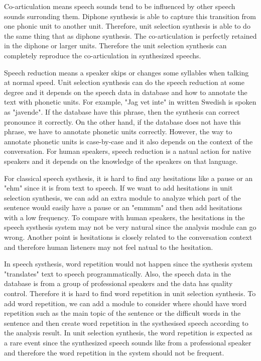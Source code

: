 \documentclass[12pt]{article}
\newenvironment{problem}[2][Problem]{\begin{trivlist}
\item[\hskip \labelsep {\bfseries #1}\hskip \labelsep {\bfseries #2.}]}{\end{trivlist}}
\begin{document}
\begin{problem}{2.2}

    Co-articulation means speech sounds tend to be influenced by other speech
    sounds surronding them.
    Diphone synthesis is able to capture this transition from one phonic unit
    to another unit.
    Therefore, unit selection synthesis is able to do the same thing that as
    diphone synthesis.
    The co-articulation is perfectly retained in the diphone or larger
    units.
    Therefore the unit selection synthesis can completely reproduce
    the co-articulation in synthesized speechs.


    Speech reduction means a speaker skips or changes some syllables when talking
    at normal speed. Unit selection synthesis can do the speech reduction at
    some degree and it depends on the speech data in database and how to annotate
    the text with phonetic units.
    For example, "Jag vet inte" in written Swedish is spoken as "javende". If
    the database have this phrase, then the synthesis can correct pronounce it
    correctly. On the other hand, if the database does not have this phrase,
    we have to annotate phonetic units correctly. However, the way to annotate
    phonetic units is case-by-case and it also depends on the context of the
    conversation.
    For human speakers, speech reduction is a natual action for native speakers
    and it depends on the knowledge of the speakers on that language.

    For classical speech systhesis, it is hard to find any hesitations like
    a pause or an "ehm" since it is from text to speech.
    If we want to add hesitations in unit
    selection synthesis, we can add an extra module to analyze which part of the
    sentence would easily have a pause or an "emmmm" and then add hesitations with
    a low frequency.
    To compare with human speakers, the hesitations in the speech systhesis system
    may not be very natural since the analysis module can go wrong. Another point
    is hesitations is closely related to the conversation context and therefore
    human listeners may not feel natual to the hesitation.

    In speech systhesis, word repetition would not happen since the systhesis
    system "translates" text to speech programmatically. Also, the speech data in
    the database is from a group of professional speakers and the data has quality control.
    Therefore it is hard to find word repetition in unit selection synthesis.
    To add word repetition, we can add a module to consider where should have
    word repetition such as the main topic of the sentence or the difficult words
    in the sentence and then create word repetition in the systhesised speech according
    to the analysis result.
    In unit selection synthesis, the word repetition is expected as a rare event
    since the synthesized speech sounds like from a professional speaker and therefore
    the word repetition in the system should not be frequent.
\end{problem}
\end{document}
